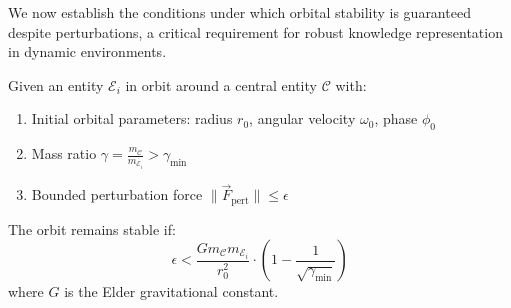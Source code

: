 We now establish the conditions under which orbital stability is guaranteed despite perturbations, a critical requirement for robust knowledge representation in dynamic environments.

\begin{theorem}
Given an entity $\mathcal{E}_i$ in orbit around a central entity $\mathcal{C}$ with:
\begin{enumerate}
    \item Initial orbital parameters: radius $r_0$, angular velocity $\omega_0$, phase $\phi_0$
    \item Mass ratio $\gamma = \frac{m_{\mathcal{C}}}{m_{\mathcal{E}_i}} > \gamma_{\text{min}}$
    \item Bounded perturbation force $\|\vec{F}_{\text{pert}}\| \leq \epsilon$
\end{enumerate}

The orbit remains stable if:
\begin{equation}
\epsilon < \frac{G m_{\mathcal{C}} m_{\mathcal{E}_i}}{r_0^2} \cdot \left(1 - \frac{1}{\sqrt{\gamma_{\text{min}}}}\right)
\end{equation}
where $G$ is the Elder gravitational constant.
\end{theorem}

